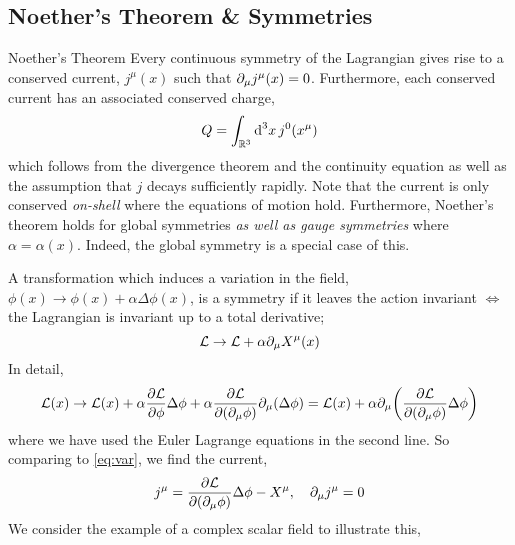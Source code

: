 \subsection{Noether's Theorem \& Symmetries}
\begin{thm}{Noether's Theorem}
Every continuous symmetry of the Lagrangian gives rise to a conserved current, $j^\mu (x)$ such that $\partial_\mu j^\mu (x) = 0$. Furthermore, each conserved current has an associated conserved charge,
\begin{equation}
Q = \int_{\mathbb{R}^3}{\text{d}^3 x \, j^0 (x^{\mu})}
\end{equation}
which follows from the divergence theorem and the continuity equation as well as the assumption that $j$ decays sufficiently rapidly. Note that the current is only conserved \emph{on-shell} where the equations of motion hold. Furthermore, Noether's theorem holds for global symmetries \emph{as well as gauge symmetries} where $\alpha = \alpha(x)$. Indeed, the global symmetry is a special case of this.
\end{thm}
A transformation which induces a variation in the field, $\phi(x) \rightarrow \phi(x) + \alpha \Delta \phi(x)$, is a symmetry if it leaves the action invariant $\iff$ the Lagrangian is invariant up to a total derivative; 
\begin{equation}
\label{eq:var}
\mathcal{L} \rightarrow \mathcal{L} + \alpha \partial_\mu X^\mu (x)
\end{equation} 
In detail,
\begin{dmath}
\mathcal{L}(x) \rightarrow \mathcal{L}(x) + \alpha \frac{\del \mathcal{L}}{\del \phi}\Delta \phi + \alpha \frac{\del \mathcal{L}}{\del \left(\del_\mu \phi\right)}\del_\mu \left(\Delta \phi\right) = \mathcal{L}(x) + \alpha\del_\mu \left(\frac{\del \mathcal{L}}{\del\left(\del_\mu \phi\right)} \Delta \phi \right)
\end{dmath}
where we have used the Euler Lagrange equations in the second line. So comparing to \eqref{eq:var}, we find the current, 
\begin{equation}
\label{eq:current}
j^{\mu} = \frac{\del \mathcal{L}}{\del \left(\del_\mu \phi\right)} \Delta \phi - X^\mu, \quad \del_\mu j^\mu = 0
\end{equation}
We consider the example of a complex scalar field to illustrate this,
